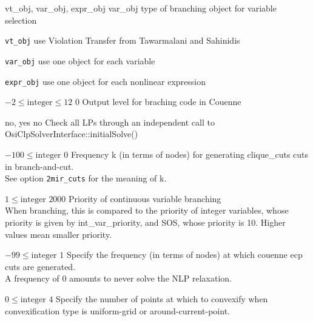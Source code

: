 %
{\ttfamily vt\_obj, var\_obj, expr\_obj}%
{var\_obj}%
{type of branching object for variable selection}%
{\begin{list}{}{
\setlength{\parsep}{0em}
\setlength{\leftmargin}{5ex}
\setlength{\labelwidth}{2ex}
\setlength{\itemindent}{0ex}
\setlength{\topsep}{0pt}}
\item[\texttt{vt\_obj}] use Violation Transfer from Tawarmalani and Sahinidis
\item[\texttt{var\_obj}] use one object for each variable
\item[\texttt{expr\_obj}] use one object for each nonlinear expression
\end{list}
}

%
{$-2\leq\textrm{integer}\leq12$}%
{$0$}%
{Output level for braching code in Couenne}%
{}

%
{\ttfamily no, yes}%
{no}%
{Check all LPs through an independent call to OsiClpSolverInterface::initialSolve()}%
{}

%
{$-100\leq\textrm{integer}$}%
{$0$}%
{Frequency k (in terms of nodes) for generating clique\_cuts cuts in branch-and-cut.\\
See option \texttt{2mir\_cuts} for the meaning of k.}%
{}

%
{$1\leq\textrm{integer}$}%
{$2000$}%
{Priority of continuous variable branching\\
When branching, this is compared to the priority of integer variables, whose priority is given by int\_var\_priority, and SOS, whose priority is 10. Higher values mean smaller priority.}%
{}

%
{$-99\leq\textrm{integer}$}%
{$1$}%
{Specify the frequency (in terms of nodes) at which couenne ecp cuts are generated.\\
A frequency of 0 amounts to never solve the NLP relaxation.}%
{}

%
{$0\leq\textrm{integer}$}%
{$4$}%
{Specify the number of points at which to convexify when convexification type is uniform-grid or around-current-point.}%
{}

